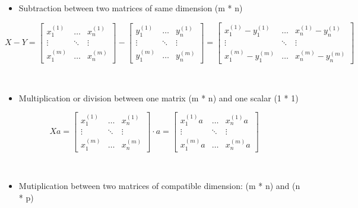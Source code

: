 \documentclass[]{article}
\providecommand{\tightlist}{%
  \setlength{\itemsep}{0pt}\setlength{\parskip}{0pt}}
\begin{document}
\begin{itemize}
\tightlist
\item
  Subtraction between two matrices of same dimension (m * n)
\end{itemize}

\large

\[
X - Y = 
\begin{bmatrix} 
x_{1}^{(1)} & \dots & x_{n}^{(1)}  \\ 
\vdots & \ddots & \vdots \\ 
x_{1}^{(m)} & \dots & x_{n}^{(m)} 
\end{bmatrix} - 
\begin{bmatrix} 
y_{1}^{(1)} & \dots & y_{n}^{(1)}  \\ 
\vdots & \ddots & \vdots \\ 
y_{1}^{(m)} & \dots & y_{n}^{(m)} 
\end{bmatrix} = 
\begin{bmatrix} 
x_{1}^{(1)} - y_{1}^{(1)}  & \dots & x_{n}^{(1)} - y_{n}^{(1)}  \\ 
\vdots & \ddots & \vdots \\ 
x_{1}^{(m)} - y_{1}^{(m)} & \dots & x_{n}^{(m)} - y_{n}^{(m)}
\end{bmatrix}
\] \normalsize

​

\begin{itemize}
\tightlist
\item
  Multiplication or division between one matrix (m * n) and one scalar
  (1 * 1)
\end{itemize}

\large

\[
Xa = 
\begin{bmatrix} 
x_{1}^{(1)} & \dots & x_{n}^{(1)}  \\ 
\vdots & \ddots & \vdots \\ 
x_{1}^{(m)} & \dots & x_{n}^{(m)} 
\end{bmatrix} 
\cdot a
= 
\begin{bmatrix} 
x_{1}^{(1)} a  & \dots & x_{n}^{(1)} a  \\ 
\vdots & \ddots & \vdots \\ 
x_{1}^{(m)} a & \dots & x_{n}^{(m)} a
\end{bmatrix}
\] \normalsize

​

\begin{itemize}
\tightlist
\item
  Mutiplication between two matrices of compatible dimension: (m * n)
  and (n * p)
\end{itemize}
\end{document}
